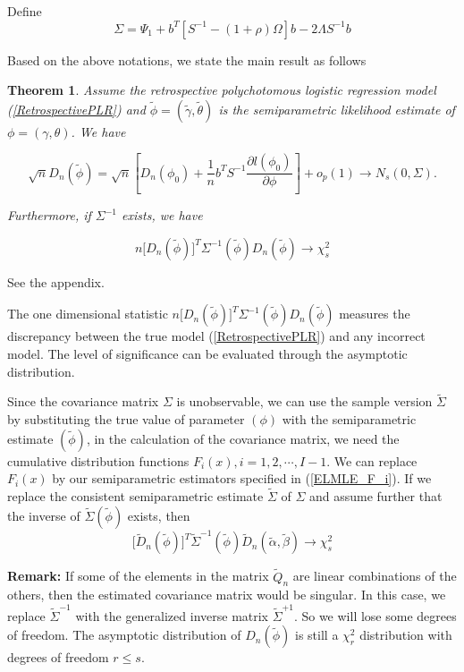 \documentclass[12]{interact}
\theoremstyle{plain}%
\newtheorem{theorem}{Theorem}[section]
\theoremstyle{definition}
\theoremstyle{remark}
\begin{document}
Define
$$
\Sigma=\Psi_1 + b^T[S^{-1}-(1+\rho)\Omega]b-2\Lambda S^{-1}b
$$

Based on the above notations, we state the main result as follows
\begin{theorem}
	Assume the retrospective polychotomous logistic regression model (\ref{RetrospectivePLR}) and $\tilde{\phi}=(\tilde{\gamma}, \tilde{\theta})$ is the semiparametric likelihood estimate of $\phi=(\gamma, \theta)$. We have
	
	\begin{equation}
		\sqrt{n}D_n(\tilde{\phi})=\sqrt{n}\left[ D_n(\phi_0)
		+\frac{1}{n}b^T S^{-1}\frac{\partial l(\phi_0)}{\partial \phi
		}\right]+o_p(1)\rightarrow N_s(0,\Sigma).\label{Q_Normality}
	\end{equation}

	Furthermore, if $\Sigma^{-1}$ exists, we have
	
	\begin{equation}
		n\big[D_n(\tilde{\phi})\big]^T \Sigma^{-1}(\tilde{\phi})D_n(\tilde{\phi})\rightarrow
		\chi_s^2
	\end{equation}
\end{theorem}
 \hspace{3mm} See the appendix.

\noindent The one dimensional statistic $n\big[D_n(\tilde{\phi})\big]^T \Sigma^{-1}(\tilde{\phi})D_n(\tilde{\phi})$ measures the discrepancy between the true model (\ref{RetrospectivePLR}) and any incorrect model. The level of significance can be evaluated through the asymptotic distribution.

Since the covariance matrix $\Sigma$ is unobservable, we can use the sample version
$\tilde{\Sigma}$ by substituting the true value of parameter
$(\phi)$ with the semiparametric estimate $(\tilde{\phi})$, in the calculation of the covariance matrix, we need the cumulative distribution functions
$F_i(x), i=1, 2, \cdots, I-1$. We can replace $F_i(x)$ by our
semiparametric estimators specified in (\ref{ELMLE_F_i}). If we
replace the consistent semiparametric estimate $\tilde{\Sigma}$ of
$\Sigma$ and assume further that the inverse of
$\tilde{\Sigma}(\tilde{\phi})$ exists, then
$$\big[\tilde{D}_n(\tilde{\phi})\big]^T \tilde{\Sigma}^{-1}(\tilde{\phi})\tilde{D}_n(\tilde{\alpha}, \tilde{\beta})\rightarrow
\chi_s^2$$

\noindent \textbf{Remark:} 
If some of the elements in the matrix $ \tilde{Q}_n$ are linear
combinations of the others, then the estimated covariance matrix
would be singular. In this case, we replace $\tilde{\Sigma}^{-1}$
with the generalized inverse matrix $\tilde{\Sigma}^{+1}$. So we
will lose some degrees of freedom. The asymptotic distribution of
$D_n(\tilde{\phi})$ is still a $\chi_r^2$
distribution with degrees of freedom $r\le s$.
\end{document}

